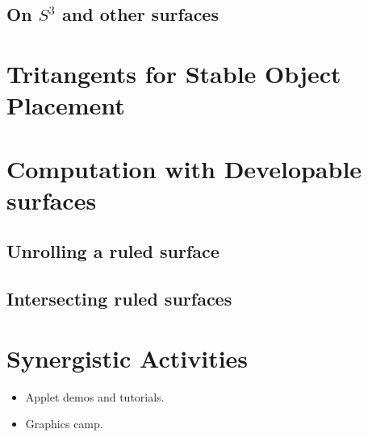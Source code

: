 \documentclass[11pt]{article}
\begin{document}
\subsection{On $S^3$ and other surfaces}

\section{Tritangents for Stable Object Placement}

\section{Computation with Developable surfaces}
\subsection{Unrolling a ruled surface}
\subsection{Intersecting ruled surfaces}

\section{Synergistic Activities}

\begin{itemize}
\item Applet demos and tutorials.
\item Graphics camp.
\end{itemize}
\end{document}
